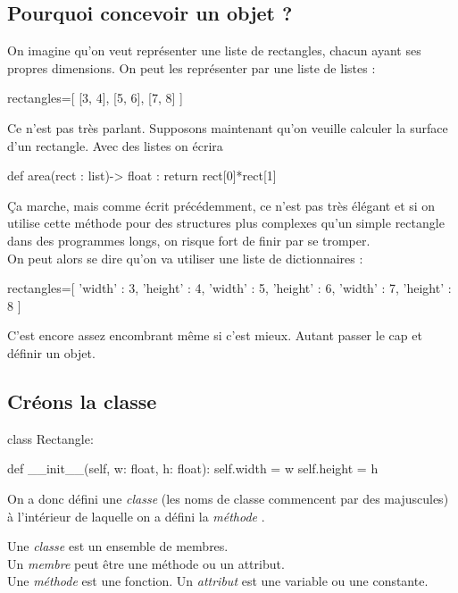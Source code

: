 \documentclass[a4paper,12pt,french]{book}
\begin{document}
    \subsection{Pourquoi concevoir un objet ?}
    On imagine qu'on veut représenter une liste de rectangles, chacun ayant ses propres dimensions. On peut les représenter par une liste de listes :
\begin{pythoncode}
rectangles=[
            [3, 4], 
            [5, 6], 
            [7, 8]
           ]
\end{pythoncode}
    Ce n'est pas très parlant. 
    Supposons maintenant qu'on veuille calculer la surface d'un rectangle. Avec des listes on écrira
\begin{pythoncode}
def area(rect : list)-> float :
    return rect[0]*rect[1]
\end{pythoncode}
    Ça marche, mais comme écrit précédemment, ce n'est pas très élégant et si on utilise cette méthode pour des structures plus complexes qu'un simple rectangle dans des programmes longs, on risque fort de finir par se tromper.\\
    
    On peut alors se dire qu'on va utiliser une liste de dictionnaires :
\begin{pythoncode}
rectangles=[
            {'width' : 3, 'height' : 4}, 
            {'width' : 5, 'height' : 6}, 
            {'width' : 7, 'height' : 8}
           ]
\end{pythoncode}

    C'est encore assez encombrant même si c'est mieux. Autant passer le cap et définir un objet.
    \subsection{Créons la classe}
    
    \begin{pythoncode}
class Rectangle:

def __init__(self, w: float, h: float):
    self.width = w
    self.height = h
\end{pythoncode}
    
    On a donc défini une \textit{classe}  (les noms de classe commencent par des majuscules) à l'intérieur de laquelle on a défini la \textit{méthode} .\\
    
    \begin{definition}
        Une \textit{classe} est un ensemble de membres.\\
        Un \textit{membre} peut être une méthode ou un attribut.\\
        Une \textit{méthode} est une fonction.
        Un \textit{attribut} est une variable ou une constante.
    \end{definition}
    
\end{document}
